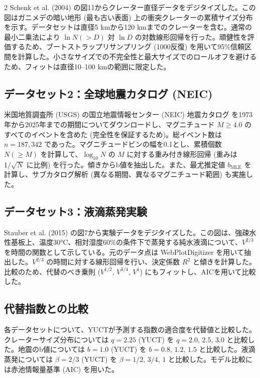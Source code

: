 \documentclass[11pt,a4paper]{article}
\begin{document}
\begin{multicols}{2}
		Schenk et al. (2004) \cite{Schenk2004} の図11からクレーター直径データをデジタイズした。この図はガニメデの暗い地形 (最も古い表面) 上の衝突クレーターの累積サイズ分布を示す。データセットは直径5 kmから120 kmまでのクレーターを含む。通常の最小二乗法により \(\ln N(>D)\) 対 \(\ln D\) の対数線形回帰を行った。頑健性を評価するため、ブートストラップリサンプリング (1000反復) を用いて95\%信頼区間を計算した。小さなサイズでの不完全性と最大サイズでのロールオフを避けるため、フィットは直径10–100 kmの範囲に限定した。
		
		\subsection{データセット2：全球地震カタログ (NEIC)}
		
		米国地質調査所 (USGS) の国立地震情報センター (NEIC) 地震カタログ \cite{USGSNEIC} を1973年から2025年までの期間についてダウンロードし、マグニチュード \(M \ge 4.0\) のすべてのイベントを含めた (完全性を保証するため)。総イベント数は \(n = 187,342\) であった。マグニチュードビンの幅を0.1とし、累積個数 \(N(\ge M)\) を計算して、\(\log_{10} N\) の \(M\) に対する重み付き線形回帰 (重みは \(1/\sqrt{N}\) に比例) を行った。傾きからb値を抽出した。また、最尤推定値 \(b_{\text{MLE}}\) \cite{Aki1965} を計算し、サブカタログ解析 (異なる期間、異なるマグニチュード範囲) も実施した。
		
		\subsection{データセット3：液滴蒸発実験}
		
		Stauber et al. (2015) \cite{Stauber2015} の図7から実験データをデジタイズした。この図は、強疎水性基板上、温度30°C、相対湿度60\%の条件下で蒸発する純水液滴について、\(V^{2/3}\) を時間の関数として示している。元のデータ点は WebPlotDigitizer \cite{WebPlotDigitizer} を用いて抽出した。\(V^{2/3}\) の時間に対する線形回帰を行い、決定係数 \(R^2\) と傾きを計算した。比較のため、代替のべき乗則 (\(V^{1/2}\), \(V^{3/4}\), \(V^{1}\)) にもフィットし、AICを用いて比較した。
		
		\subsection{代替指数との比較}
		
		各データセットについて、YUCTが予測する指数の適合度を代替値と比較した。クレーターサイズ分布については \(q = 2.25\) (YUCT) を \(q = 2.0\), \(2.5\), \(3.0\) と比較した。地震のb値については \(b = 1.0\) (YUCT) を \(b = 0.8\), \(1.2\), \(1.5\) と比較した。液滴蒸発については \(\beta = 2/3\) (YUCT) を \(\beta = 1/2\), \(3/4\), \(1\) と比較した。モデル比較には赤池情報量基準 (AIC) を用いた。
		

\end{multicols}
\end{document}
